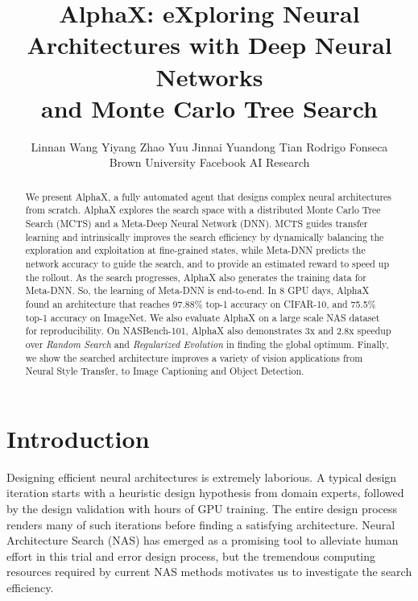 \documentclass[10pt,twocolumn,letterpaper]{article}
\renewcommand{\thefootnote}{*}
\begin{document}
\newcommand{\Commentl}[1]{ {\hfill  \it #1}}
\newcommand{\Comment}[1]{ {\begin{flushright}  \it #1 \end{flushright}}}

\title{ \vspace{-0.2in} AlphaX: eXploring Neural Architectures with Deep Neural Networks \\ and Monte Carlo Tree Search \vspace{-0.2in}}


\author{Linnan Wang \quad Yiyang Zhao \quad Yuu Jinnai  \quad Yuandong Tian \quad Rodrigo Fonseca \\
Brown University \quad Facebook AI Research}



\maketitle
\renewcommand{\thefootnote}{\arabic{footnote}}


\begin{abstract}
We present AlphaX, a fully automated agent that designs complex neural architectures from scratch.
AlphaX explores the search space with a distributed Monte Carlo Tree Search (MCTS) and a Meta-Deep Neural Network (DNN). MCTS guides transfer learning and intrinsically improves the search efficiency by dynamically balancing the exploration and exploitation at fine-grained states, while Meta-DNN predicts the network accuracy to guide the search, and to provide an estimated reward to speed up the rollout. As the search progresses, AlphaX also generates the training data for Meta-DNN. So, the learning of Meta-DNN is end-to-end. In 8 GPU days, AlphaX found an architecture that reaches 97.88\% top-1 accuracy on CIFAR-10, and 75.5\% top-1 accuracy on ImageNet. We also evaluate AlphaX on a large scale NAS dataset for reproducibility. On NASBench-101, AlphaX also demonstrates 3x and 2.8x speedup over \textit{Random Search} and \textit{Regularized Evolution} in finding the global optimum. Finally, we show the searched architecture improves a variety of vision applications from Neural Style Transfer, to Image Captioning and Object Detection.
\end{abstract}

\section{Introduction}

Designing efficient neural architectures is extremely laborious. A typical design iteration starts with a heuristic design hypothesis from domain experts, followed by the design validation with hours of GPU training. The entire design process renders many of such iterations before finding a satisfying architecture. Neural Architecture Search (NAS) has emerged as a promising tool to alleviate human effort in this trial and error design process, but the tremendous computing resources required by current NAS methods motivates us to investigate the search efficiency.
\end{document}
